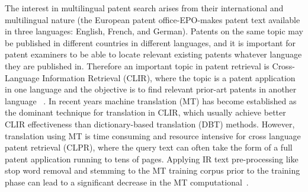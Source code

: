The interest in multilingual patent search arises from their international and multilingual nature (the European patent office-EPO-makes patent text available in three languages: English, French, and German). Patents on the same topic may be published in different countries in different languages, and it is important for patent examiners to be able to locate relevant existing patents whatever language they are published in. Therefore an important topic in patent retrieval is Cross-Language Information Retrieval (CLIR), where the topic is a patent application in one language and the objective is to find relevant prior-art patents in another language ~\citep{lupu2013patent,joho2010survey, roda2010clef, DBLP:conf/clef/PiroiLHSMF12}. In recent years machine
translation (MT) has become established as the dominant technique for translation in CLIR, which usually achieve better CLIR effectiveness than dictionary-based translation (DBT) methods. However, translation using MT is time consuming and resource intensive for cross language patent retrieval (CLPR), where the query text can often take the form of a full patent application running to tens of pages. Applying IR text pre-processing like stop word removal and stemming to the MT training corpus prior to the training phase can lead to a significant decrease in the MT computational~\citep{magdy2013studying}.


